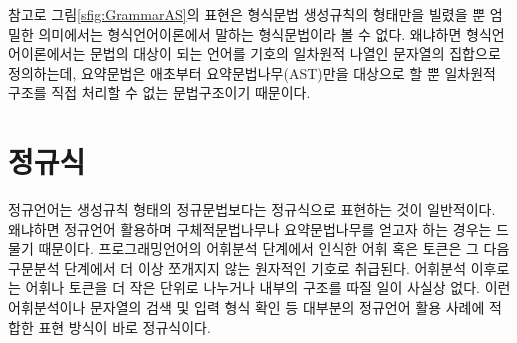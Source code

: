 참고로 그림\;\ref{sfig:GrammarAS}의 표현은 형식문법 생성규칙의
형태만을 빌렸을 뿐 엄밀한 의미에서는 형식언어이론에서 말하는
형식문법이라 볼 수 없다. 왜냐하면 형식언어이론에서는 문법의
대상이 되는 언어를 기호의 일차원적 나열인 문자열의 집합으로
정의하는데, 요약문법은 애초부터 요약문법나무(AST)만을 대상으로
할 뿐 일차원적 구조를 직접 처리할 수 없는 문법구조이기 때문이다.

\section{정규식}
\label{sec:regex}
정규언어는 생성규칙 형태의 정규문법보다는 정규식으로 표현하는 것이
일반적이다. 왜냐하면 정규언어 활용하며 구체적문법나무나 요약문법나무를
얻고자 하는 경우는 드물기 때문이다. 프로그래밍언어의 어휘분석 단계에서
인식한 어휘 혹은 토큰은 그 다음 구문분석 단계에서 더 이상 쪼개지지 않는
원자적인 기호로 취급된다. 어휘분석 이후로는 어휘나 토큰을 더 작은 단위로
나누거나 내부의 구조를 따질 일이 사실상 없다. 이런 어휘분석이나 문자열의
검색 및 입력 형식 확인 등 대부분의 정규언어 활용 사례에 적합한 표현 방식이
바로 정규식이다.

